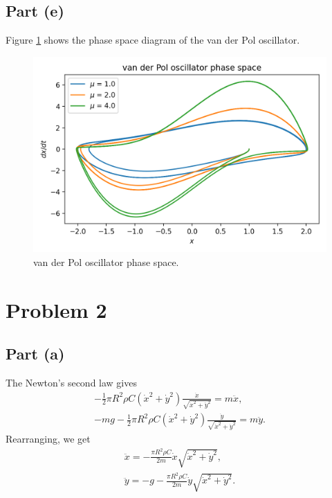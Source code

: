 \documentclass[11pt]{article}
\begin{document}
\subsection{Part (e)}
Figure \ref{fig:vdp} shows the phase space diagram of the van der Pol oscillator.
\begin{figure}[H]
    \centering
    \includegraphics[scale = 0.7]{Figs/ps-9-1e.png}
    \caption{van der Pol oscillator phase space.}
    \label{fig:vdp}
\end{figure}

\section{Problem 2}

\subsection{Part (a)}
The Newton's second law gives
\begin{equation}
\begin{gathered}
    -\frac{1}{2}\pi R^2 \rho C (\dot{x}^2 + \dot{y}^2) \frac{\dot{x}}{\sqrt{\dot{x}^2 + \dot{y}^2}} = m \ddot{x}, \\
    -mg -\frac{1}{2}\pi R^2 \rho C (\dot{x}^2 + \dot{y}^2) \frac{\dot{y}}{\sqrt{\dot{x}^2 + \dot{y}^2}} = m \ddot{y}.
\end{gathered}
\end{equation}
Rearranging, we get
\begin{equation}
\begin{gathered}
    \ddot{x} = -\frac{\pi R^2 \rho C}{2m} \dot{x} \sqrt{\dot{x}^2 + \dot{y}^2}, \\
    \ddot{y} = -g -\frac{\pi R^2 \rho C}{2m} \dot{y} \sqrt{\dot{x}^2 + \dot{y}^2}.
\end{gathered}
\end{equation}
\end{document}
